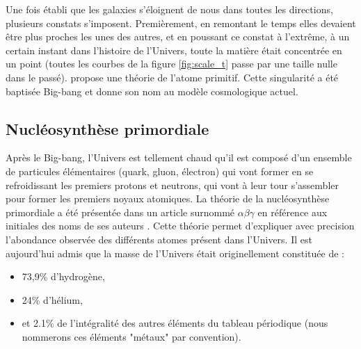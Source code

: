 Une fois établi que les galaxies s'éloignent de nous dans toutes les directions, plusieurs constats s'imposent.
Premièrement, en remontant le temps elles devaient être plus proches les unes des autres, et en poussant ce constat à l’extrême, à un certain instant dans l'histoire de l'Univers, toute la matière était concentrée en un point (toutes les courbes de la figure \ref{fig:scale_t} passe par une taille nulle dans le passé).
\cite{1927ASSB...47...49L} propose une théorie de l'atome primitif.
Cette singularité a été baptisée Big-bang et donne son nom au modèle cosmologique actuel.

%

\subsection{Nucléosynthèse primordiale}
\label{sec:nucleosynthese_primordiale}
Après le Big-bang, l'Univers est tellement chaud qu'il est composé d'un ensemble de particules élémentaires (quark, gluon, électron) qui vont former en se refroidissant les premiers protons et neutrons, qui vont à leur tour s'assembler pour former les premiers noyaux atomiques.
La théorie de la nucléosynthèse primordiale a été présentée dans un article surnommé $\alpha \beta \gamma$ en référence aux initiales des noms de ses auteurs \citep{PhysRev.73.803}.
Cette théorie permet d'expliquer avec precision l'abondance observée des différents atomes présent dans l'Univers.
Il est aujourd'hui admis que la masse de l'Univers était originellement constituée de : 

\begin{itemize}
\item 73,9\% d’hydrogène,
\item 24\% d’hélium,
\item et 2.1\% de l'intégralité des autres éléments du tableau périodique  (nous nommerons ces éléments "métaux" par convention).
\end{itemize}


